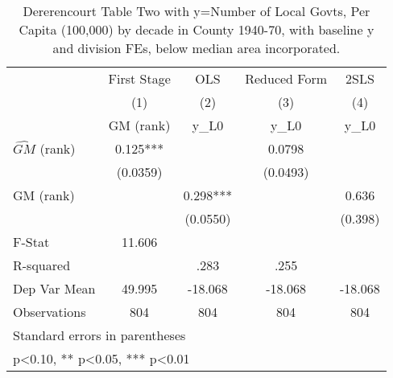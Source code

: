 \begin{table}[htbp]\centering
\def\sym#1{\ifmmode^{#1}\else\(^{#1}\)\fi}
\caption{Dererencourt Table Two with y=Number of Local Govts, Per Capita (100,000) by decade in County 1940-70, with baseline y and division FEs, below median area incorporated.}
\begin{tabular}{l*{4}{c}}
\toprule
                    & First Stage   &         OLS   &Reduced Form   &        2SLS   \\
                    &\multicolumn{1}{c}{(1)}&\multicolumn{1}{c}{(2)}&\multicolumn{1}{c}{(3)}&\multicolumn{1}{c}{(4)}\\
                    &\multicolumn{1}{c}{GM  (rank)}&\multicolumn{1}{c}{y\_L0}&\multicolumn{1}{c}{y\_L0}&\multicolumn{1}{c}{y\_L0}\\
\midrule
$\hat{GM}$ (rank)   &       0.125***&               &      0.0798   &               \\
                    &    (0.0359)   &               &    (0.0493)   &               \\
\addlinespace
GM  (rank)          &               &       0.298***&               &       0.636   \\
                    &               &    (0.0550)   &               &     (0.398)   \\
\midrule
F-Stat              &      11.606   &               &               &               \\
R-squared           &               &        .283   &        .255   &               \\
Dep Var Mean        &      49.995   &     -18.068   &     -18.068   &     -18.068   \\
Observations        &         804   &         804   &         804   &         804   \\
\bottomrule
\multicolumn{5}{l}{\footnotesize Standard errors in parentheses}\\
\multicolumn{5}{l}{\footnotesize * p<0.10, ** p<0.05, *** p<0.01}\\
\end{tabular}
\end{table}
